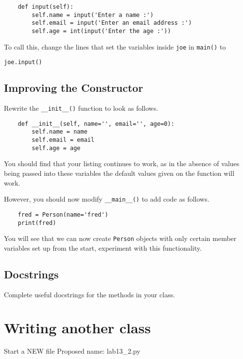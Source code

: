 \documentclass[12pt,oneside]{cttutorial}
\begin{document}
\begin{lstlisting}
    def input(self):
        self.name = input('Enter a name :')
        self.email = input('Enter an email address :')
        self.age = int(input('Enter the age :'))
\end{lstlisting}

To call this, change the lines that set the variables inside \lstinline!joe! in \lstinline!main()! to

\begin{lstlisting}
joe.input()
\end{lstlisting}

\subsection{Improving the Constructor}

Rewrite the \lstinline!__init__()! function to look as follows.

\begin{lstlisting}
    def __init__(self, name='', email='', age=0):
        self.name = name
        self.email = email
        self.age = age
\end{lstlisting}

You should find that your listing continues to work, as in the absence of values being passed into these variables the default values given on the function will work.

However, you should now modify \lstinline!__main__()! to add code as follows.

\begin{lstlisting}
    fred = Person(name='fred')
    print(fred)
\end{lstlisting}

You will see that we can now create \lstinline!Person! objects with only certain member variables set up from the start, experiment with this functionality.

\subsection{Docstrings}
Complete useful docstrings for the methods in your class.

\section{Writing another class}

\alert{Start a NEW file}
Proposed name: lab13\_2.py
\end{document}
